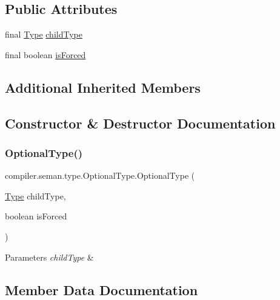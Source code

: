 \subsection*{Public Attributes}
\begin{DoxyCompactItemize}
\item 
final \hyperlink{classcompiler_1_1seman_1_1type_1_1_type}{Type} \hyperlink{classcompiler_1_1seman_1_1type_1_1_optional_type_aaf00b7ba803037f26967cd45767f7e84}{child\+Type}
\item 
final boolean \hyperlink{classcompiler_1_1seman_1_1type_1_1_optional_type_ab55a110a6f067b755cb1dca374ab1e46}{is\+Forced}
\end{DoxyCompactItemize}
\subsection*{Additional Inherited Members}


\subsection{Constructor \& Destructor Documentation}
\mbox{\label{classcompiler_1_1seman_1_1type_1_1_optional_type_ad47f6ea82a4b898d3d6806ff6294cee4}} 
\subsubsection{\texorpdfstring{Optional\+Type()}{OptionalType()}}
{\footnotesize\ttfamily compiler.\+seman.\+type.\+Optional\+Type.\+Optional\+Type (\begin{DoxyParamCaption}\item[{\hyperlink{classcompiler_1_1seman_1_1type_1_1_type}{Type}}]{child\+Type,  }\item[{boolean}]{is\+Forced }\end{DoxyParamCaption})}


\begin{DoxyParams}{Parameters}
{\em child\+Type} & \\
\hline
\end{DoxyParams}


\subsection{Member Data Documentation}
\mbox{\label{classcompiler_1_1seman_1_1type_1_1_optional_type_aaf00b7ba803037f26967cd45767f7e84}} 
